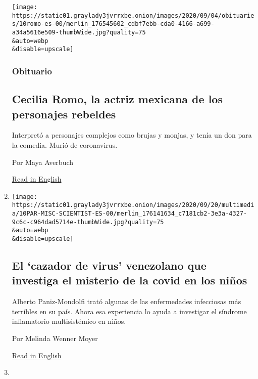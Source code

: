 \begin{enumerate}
  \texttt{[image: https://static01.graylady3jvrrxbe.onion/images/2020/09/04/obituaries/10romo-es-00/merlin\_176545602\_cdbf7ebb-cda0-4166-a699-a34a5616e509-thumbWide.jpg?quality=75\\\&auto=webp\\\&disable=upscale]}

  \hypertarget{obituario}{%
  \subsubsection{Obituario}\label{obituario}}

  \hypertarget{cecilia-romo-la-actriz-mexicana-de-los-personajes-rebeldes}{%
  \subsection{Cecilia Romo, la actriz mexicana de los personajes
  rebeldes}\label{cecilia-romo-la-actriz-mexicana-de-los-personajes-rebeldes}}

  Interpretó a personajes complejos como brujas y monjas, y tenía un don
  para la comedia. Murió de coronavirus.

  Por Maya Averbuch

  \href{https://www.nytimes3xbfgragh.onion/2020/09/08/obituaries/cecilia-romo-dead-coronavirus.html}{Read
  in English}
\item
  \href{/es/2020/09/10/espanol/ciencia-y-tecnologia/Alberto-Paniz-Mondolf-coronavirus-ninos.html}{}

  \texttt{[image: https://static01.graylady3jvrrxbe.onion/images/2020/09/20/multimedia/10PAR-MISC-SCIENTIST-ES-00/merlin\_176141634\_c7181cb2-3e3a-4327-9c6c-c964dad5714e-thumbWide.jpg?quality=75\\\&auto=webp\\\&disable=upscale]}

  \hypertarget{el-cazador-de-virus-venezolano-que-investiga-el-misterio-de-la-covid-en-los-niuxf1os}{%
  \subsection{El `cazador de virus' venezolano que investiga el misterio
  de la covid en los
  niños}\label{el-cazador-de-virus-venezolano-que-investiga-el-misterio-de-la-covid-en-los-niuxf1os}}

  Alberto Paniz-Mondolfi trató algunas de las enfermedades infecciosas
  más terribles en su país. Ahora esa experiencia lo ayuda a investigar
  el síndrome inflamatorio multisistémico en niños.

  Por Melinda Wenner Moyer

  \href{https://www.nytimes3xbfgragh.onion/2020/09/09/parenting/children-coronavirus-sickness.html}{Read
  in English}
\item
  \href{/es/2020/09/09/espanol/ciencia-y-tecnologia/salud-mental-coronavirus.html}{}


\end{enumerate}
